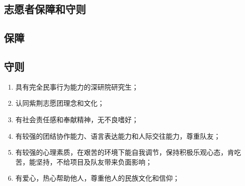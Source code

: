 \documentclass[12pt]{ctexart}
\begin{document}
\begin{appendix}
\section{志愿者保障和守则}
\subsection{保障}
\subsection{守则}
\begin{enumerate}[label = {(\chinese*)}]
\item 具有完全民事行为能力的深研院研究生；
\item 认同紫荆志愿团理念和文化；
\item 有社会责任感和奉献精神，无不良嗜好；
\item 有较强的团结协作能力、语言表达能力和人际交往能力，尊重队友；
\item 有较强的心理素质，在艰苦的环境下能自我调节，保持积极乐观心态，肯吃苦，能坚持，不给项目及队友带来负面影响； 
\item 有爱心，热心帮助他人，尊重他人的民族文化和信仰；
\end{enumerate}
\end{appendix}
\end{document}
